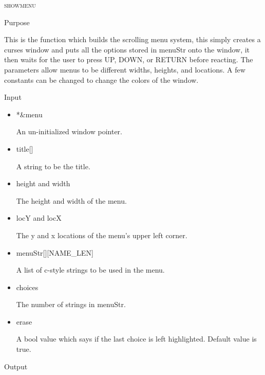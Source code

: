 \documentclass[pdftex, 11pt]{article}
\begin{document}
\begin{description}

	\item{\textsc{showmenu}}

		\begin{description}
			\item{Purpose}
				
 				This is the function which builds the scrolling menu system, this simply
				creates a curses window and puts all the options stored in menuStr onto the
				window, it then waits for the user to press UP, DOWN, or RETURN before
				reacting.  The parameters allow menus to be different widths, heights, and
				locations.  A few constants can be changed to change the colors of the window.

			\item{Input}
				
				\begin{itemize}

					\item{*\&menu}

						An un-initialized window pointer.

					\item{title[]}

						A string to be the title.

					\item{height and width}

						The height and width of the menu.

					\item{locY and locX}
						
						The y and x locations of the menu's upper left corner.

					\item{menuStr[][NAME\_LEN] }

						A list of c-style strings to be used in the menu.
						
					\item{choices}
					
						The number of strings in menuStr.

					\item{erase}
						
						A bool value which says if the last choice is left highlighted.
						Default value is true.

				\end{itemize}

			\item{Output}
				

\end{description}
\end{description}
\end{document}

